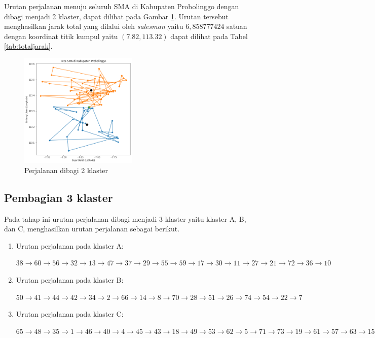 Urutan perjalanan menuju seluruh SMA di Kabupaten Probolinggo dengan dibagi menjadi 2 klaster, dapat dilihat pada Gambar \ref{fig:hasil_mtsp2}. Urutan tersebut menghasilkan jarak total yang dilalui oleh \textit{salesman} yaitu $6,858777424$ satuan dengan koordinat titik kumpul yaitu $(7.82, 113.32)$ dapat dilihat pada Tabel \ref{tab:totaljarak}.


\begin{figure}[H]
\centering
\includegraphics[width=0.5\textwidth]{Gambar/hasil_mtsp/2}
\caption{Perjalanan dibagi 2 klaster}
\label{fig:hasil_mtsp2}
\end{figure}

\subsection{Pembagian 3 klaster}

Pada tahap ini urutan perjalanan dibagi menjadi 3 klaster yaitu klaster A, B, dan C, menghasilkan urutan perjalanan sebagai berikut.

\begin{enumerate}
\item Urutan perjalanan pada klaster A:

$38\rightarrow60\rightarrow56\rightarrow32\rightarrow13\rightarrow47\rightarrow37\rightarrow29\rightarrow55\rightarrow59\rightarrow17\rightarrow30\rightarrow11\rightarrow27\rightarrow21\rightarrow72\rightarrow36\rightarrow10$

\item Urutan perjalanan pada klaster B:

$50\rightarrow41\rightarrow44\rightarrow42\rightarrow34\rightarrow2\rightarrow66\rightarrow14\rightarrow8\rightarrow70\rightarrow28\rightarrow51\rightarrow26\rightarrow74\rightarrow54\rightarrow22\rightarrow7$

\item Urutan perjalanan pada klaster C:

$65\rightarrow48\rightarrow35\rightarrow1\rightarrow46\rightarrow40\rightarrow4\rightarrow45\rightarrow43\rightarrow18\rightarrow49\rightarrow53\rightarrow62\rightarrow5\rightarrow71\rightarrow73\rightarrow19\rightarrow61\rightarrow57\rightarrow63\rightarrow15\rightarrow25\rightarrow68\rightarrow58\rightarrow24\rightarrow31\rightarrow16\rightarrow3\rightarrow12\rightarrow20\rightarrow52\rightarrow67\rightarrow69\rightarrow75\rightarrow39\rightarrow6\rightarrow64\rightarrow23\rightarrow33\rightarrow9$

\end{enumerate}


